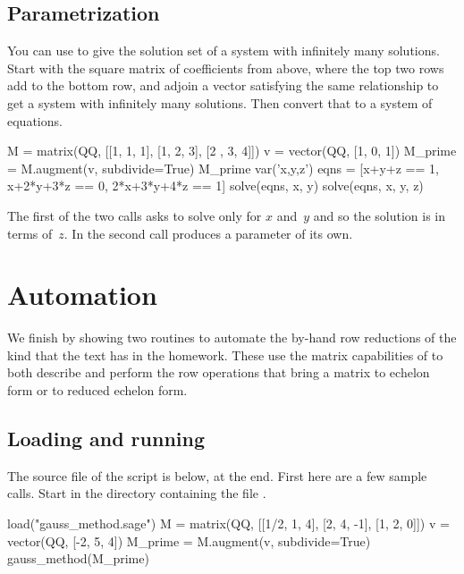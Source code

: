 \subsection{Parametrization}
You can use  to give the solution set of a system
with infinitely many solutions.
Start with the square matrix of coefficients from above,
where the top two rows add to the bottom row,
and adjoin a vector satisfying the same relationship to get
a system with infinitely many solutions.
Then convert that to a system of equations.
\begin{sageoutput}
M = matrix(QQ, [[1, 1, 1], [1, 2, 3], [2 , 3, 4]])    
v = vector(QQ, [1, 0, 1])                            
M_prime = M.augment(v, subdivide=True)               
M_prime
var('x,y,z')          
eqns = [x+y+z == 1, x+2*y+3*z == 0, 2*x+3*y+4*z == 1]
solve(eqns, x, y)   
solve(eqns, x, y, z)                                 
\end{sageoutput}
The first of the two  calls asks \Sage{} 
to solve only for $x$ and~$y$ and so the solution is in terms of~$z$.
In the second call \Sage{} produces a parameter of its own.   




\section{Automation}

We finish by showing two routines to automate the by-hand row reductions 
of the kind that the text has in the homework.
These use the matrix capabilities of \Sage{} to both describe 
and perform the row operations that bring a matrix to 
echelon form or to reduced echelon form. 

\subsection{Loading and running}
The source file of the script is below, at the end. 
First here are a few sample calls.
Start \Sage{} in the directory containing the file .
\begin{sageoutput}
load("gauss_method.sage")
M = matrix(QQ, [[1/2, 1, 4], [2, 4, -1], [1, 2, 0]])          
v = vector(QQ, [-2, 5, 4])
M_prime = M.augment(v, subdivide=True)  
gauss_method(M_prime)
\end{sageoutput}

